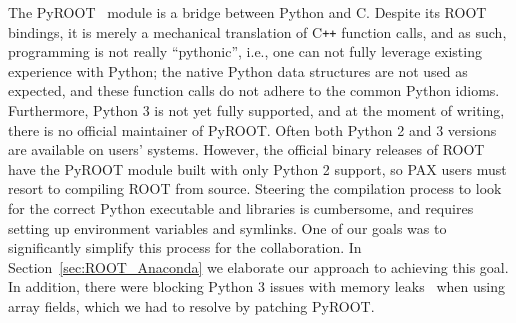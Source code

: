 \documentclass[a4paper]{jpconf}
\begin{document}
The PyROOT~\cite{1742-6596-664-6-062029} module is a bridge between Python and C. Despite its ROOT bindings,
it is merely a mechanical translation of C\texttt{++} function calls, and as such, programming is not really ``pythonic'', i.e., one 
can not fully leverage existing experience with Python;
the native Python data structures are not used as expected, and these function calls do not adhere to the common Python idioms. 
Furthermore, Python 3 is not yet fully supported, and at the moment of writing, there is no official maintainer of PyROOT.
Often both Python 2 and 3 versions are available on users' systems. However, the official binary releases of ROOT have the PyROOT module built with only Python 2 
support, so PAX users must resort to compiling ROOT from source. Steering the compilation process to look for the correct Python executable and libraries is cumbersome,
and requires setting up environment variables and symlinks. One of our goals was to significantly simplify this process for the collaboration.
In Section~\ref{sec:ROOT_Anaconda} we elaborate our approach to achieving this goal.
In addition, there were blocking Python 3 issues with memory leaks~\cite{JIRA-ROOT-7854} when using array fields, which we had to resolve by patching PyROOT.
\end{document}
